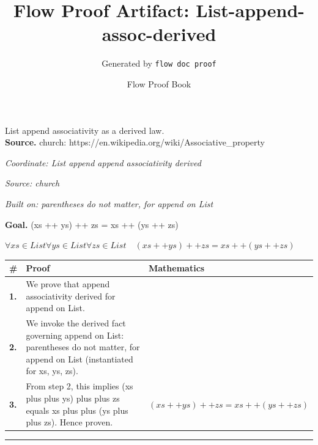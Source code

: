\documentclass[11pt]{article}
\title{Flow Proof Artifact: List-append-assoc-derived}
\author{Generated by \texttt{flow doc proof}}
\date{Flow Proof Book}
\theoremstyle{definition}
\begin{document}
\maketitle
List append associativity as a derived law.\\[0.5em]
\textbf{Source.} church: https://en.wikipedia.org/wiki/Associative\_property\\[0.5em]
\bigskip
{}\par
\smallskip\noindent\textit{Coordinate: List \cdot append \cdot append associativity derived}\par
\smallskip\noindent\textit{Source: church}\par
\smallskip\noindent\textit{Built on: parentheses do not matter, for append on List}\par
\medskip
\noindent\textbf{Goal.} (xs ++ ys) ++ zs = xs ++ (ys ++ zs)\par
\noindent$\displaystyle \forall xs \in List \forall ys \in List \forall zs \in List\quad (xs ++ ys) ++ zs = xs ++ (ys ++ zs)$\par
\medskip
\noindent
\begin{tabular}{@{} >{\raggedright\arraybackslash}p{} >{\raggedright\arraybackslash}p{} >{\raggedleft\arraybackslash}p{} @{}}
\textbf{\#} & \textbf{Proof} & \textbf{Mathematics} \\
\midrule
\textbf{1.} & We prove that append associativity derived for append on List. & \\[0.45em]
\textbf{2.} & We invoke the derived fact governing append on List: parentheses do not matter, for append on List (instantiated for xs, ys, zs). & \\[0.45em]
\textbf{3.} & From step 2, this implies (xs plus plus ys) plus plus zs equals xs plus plus (ys plus plus zs). Hence proven. & $\displaystyle (xs ++ ys) ++ zs = xs ++ (ys ++ zs)$ \\[0.45em]
\bottomrule
\end{tabular}
\label{thm:List-append-append_associativity_derived}
\par\medskip\hrule
\end{document}
